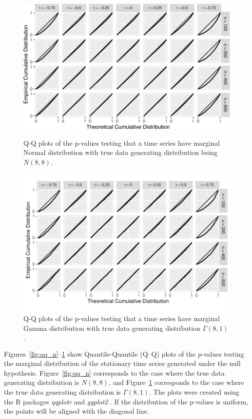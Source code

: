 \documentclass[12pt]{article}
\begin{document}
\begin{figure}[tbp]
  \includegraphics[width = .9\textwidth]{figures/normal}
  \centering
  \caption{Q-Q plots of the p-values testing that a time series
    have marginal Normal distribution with true data generating distribution
    being $N(8,8)$.}
  \label{fig:qq_n}
    \hspace{5cm}
  \includegraphics[width = .9\textwidth]{figures/gamma}
  \caption{Q-Q plots of the p-values testing that a time series
    have marginal Gamma distribution with true data
    generating distribution $\Gamma(8,1)$.}
  \label{fig:qq_g}
\end{figure}

Figures~\ref{fig:qq_n}--\ref{fig:qq_g} show Quantile-Quantile (Q--Q) plots
of the $p$-values testing the marginal distribution of the stationary time
series generated under the null hypothesis. Figure~\ref{fig:qq_n} corresponds
to the case where the true data generating distribution is $N(8,8)$, and
Figure~\ref{fig:qq_g} corresponds to the case where the true data generating
distribution is $\Gamma(8,1)$. The plots were created using the R packages
\textsl{qqplotr} and \textsl{ggplot2} \citep{qqplotr, ggplot2}. If the
distribution of the p-values is uniform, the points will be aligned with the
diagonal line.
\end{document}
